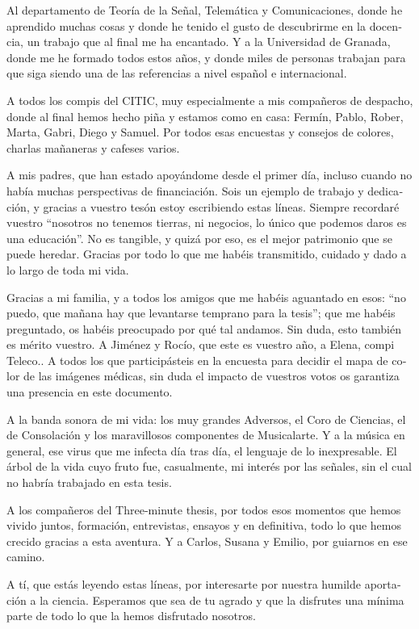 \begin{otherlanguage}{spanish}
	Al departamento de Teoría de la Señal, Telemática y Comunicaciones, donde he aprendido muchas cosas y donde he tenido el gusto de descubrirme en la docencia, un trabajo que al final me ha encantado. Y a la Universidad de Granada, donde me he formado todos estos años, y donde miles de personas trabajan para que siga siendo una de las referencias a nivel español e internacional. 
	
	A todos los compis del CITIC, muy especialmente a mis compañeros de despacho, donde al final hemos hecho piña y estamos como en casa: Fermín, Pablo, Rober, Marta, Gabri, Diego y Samuel. Por todos esas encuestas y consejos de colores, charlas mañaneras y cafeses varios. 
	
	A mis padres, que han estado apoyándome desde el primer día, incluso cuando no había muchas perspectivas de financiación. Sois un ejemplo de trabajo y dedicación, y gracias a vuestro tesón estoy escribiendo estas líneas. Siempre recordaré vuestro ``nosotros no tenemos tierras, ni negocios, lo único que podemos daros es una educación''. No es tangible, y quizá por eso, es el mejor patrimonio que se puede heredar. Gracias por todo lo que me habéis transmitido, cuidado y dado a lo largo de toda mi vida. 
	
	Gracias a mi familia, y a todos los amigos que me habéis aguantado en esos: ``no puedo, que mañana hay que levantarse temprano para la tesis''; que me habéis preguntado, os habéis preocupado por qué tal andamos. Sin duda, esto también es mérito vuestro. A Jiménez y Rocío, que este es vuestro año, a Elena, compi Teleco.. A todos los que participásteis en la encuesta para decidir el mapa de color de las imágenes médicas, sin duda el impacto de vuestros votos os garantiza una presencia en este documento. 
	
	A la banda sonora de mi vida: los muy grandes Adversos, el Coro de Ciencias, el de Consolación y los maravillosos componentes de Musicalarte. Y a la música en general, ese virus que me infecta día tras día, el lenguaje de lo inexpresable. El árbol de la vida cuyo fruto fue, casualmente, mi interés por las señales, sin el cual no habría trabajado en esta tesis. 
	
	A los compañeros del Three-minute thesis, por todos esos momentos que hemos vivido juntos, formación, entrevistas, ensayos y en definitiva, todo lo que hemos crecido gracias a esta aventura. Y a Carlos, Susana y Emilio, por guiarnos en ese camino. 
	
	A tí, que estás leyendo estas líneas, por interesarte por nuestra humilde aportación a la ciencia. Esperamos que sea de tu agrado y que la disfrutes una mínima parte de todo lo que la hemos disfrutado nosotros. 
	

\end{otherlanguage}
